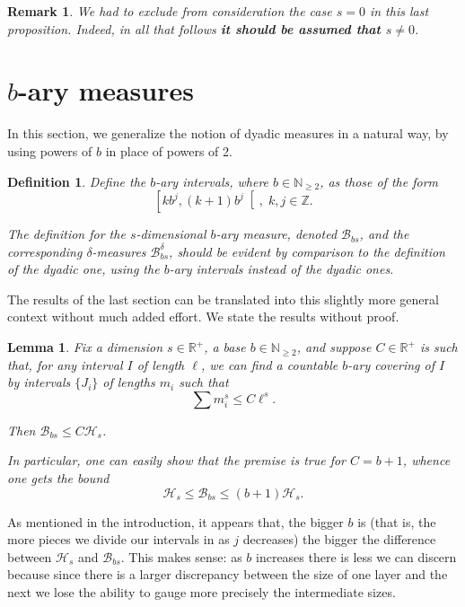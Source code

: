 \documentclass[11pt, reqno]{amsart}
\newcommand{\R}{\mathbb{R}}
\newcommand{\Z}{\mathbb{Z}}
\newcommand{\N}{\mathbb{N}}
\newcommand{\HH}{\mathcal{H}}
\newcommand{\BB}{\mathcal{B}}
\newtheorem{lemma}{Lemma}
\newtheorem{definition}{Definition}
\newtheorem{remark}{Remark}
\begin{document}
\begin{remark} \label{dimnotzero}
We had to exclude from consideration the case $s = 0$ in this last proposition. Indeed, in all that follows \textbf{it should be assumed that $s \neq 0$}.
\end{remark}

\section{$b$-ary measures}\label{sectgenbmeasures}

In this section, we generalize the notion of dyadic measures in a natural way, by using powers of $b$ in place of powers of 2.

\begin{definition}
Define the $b$-ary intervals, where $b \in \N_{\geq 2}$, as those of the form
\[\left[k b^j, (k+1) b^j \right[, \;k, j \in \Z.\]

The definition for the $s$-dimensional $b$-ary measure, denoted $\BB_{bs}$, and the corresponding $\delta$-measures $\BB_{bs}^\delta$, should be evident by comparison to the definition of the dyadic one, using the $b$-ary intervals instead of the dyadic ones.
\end{definition}

The results of the last section can be translated into this slightly more general context without much added effort. We state the results without proof.

\begin{lemma}
Fix a dimension $s \in \R^+$, a base $b \in \N_{\geq 2}$, and suppose $C \in \R^+$ is such that, for any interval $I$ of length $\ell$, we can find a countable $b$-ary covering of $I$ by intervals $\{J_i\}$ of lengths $m_i$ such that
\[\sum m_i^s \leq C \ell^s.\]

Then $\BB_{bs} \leq C \HH_s$.

In particular, one can easily show that the premise is true for $C = b+1$, whence one gets the bound
\[\HH_s \leq \BB_{bs} \leq (b+1) \HH_s.\]
\end{lemma}

As mentioned in the introduction, it appears that, the bigger $b$ is (that is, the more pieces we divide our intervals in as $j$ decreases) the bigger the difference between $\HH_s$ and $\BB_{bs}$. This makes sense: as $b$ increases there is less we can discern because since there is a larger discrepancy between the size of one layer and the next we lose the ability to gauge more precisely the intermediate sizes.
\end{document}
